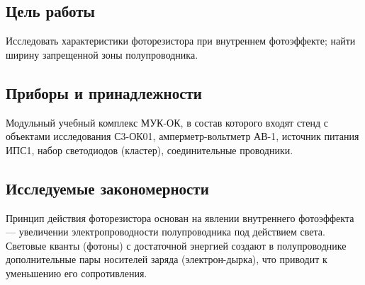 \subsection*{Цель работы}
Исследовать характеристики фоторезистора при внутреннем фотоэффекте; найти ширину запрещенной зоны полупроводника.

\subsection*{Приборы и принадлежности}
Модульный учебный комплекс МУК-ОК, в состав которого входят стенд с объектами исследования С3-ОК01, амперметр-вольтметр АВ-1, источник питания ИПС1, набор светодиодов (кластер), соединительные проводники.

    

\subsection*{Исследуемые закономерности}
Принцип действия фоторезистора основан на явлении внутреннего фотоэффекта --- увеличении электропроводности полупроводника под действием света. Световые кванты (фотоны) с достаточной энергией создают в полупроводнике дополнительные пары носителей заряда (электрон-дырка), что приводит к уменьшению его сопротивления.

    

